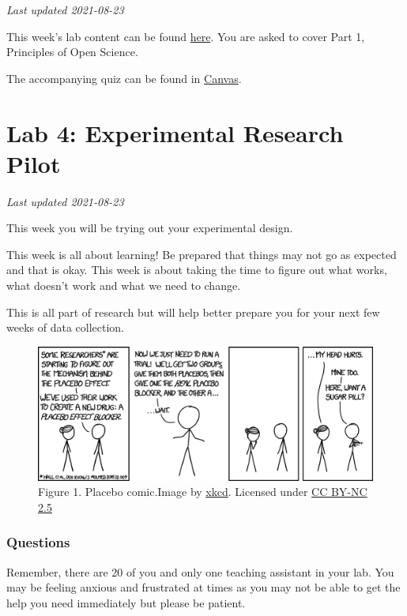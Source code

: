 \documentclass[
]{book}
\begin{document}
\emph{Last updated 2021-08-23}

This week's lab content can be found \href{https://ubco-biology.github.io/OS-Introduction/}{here}. You are asked to cover Part 1, Principles of Open Science.

The accompanying quiz can be found in \href{https://canvas.ubc.ca/courses/90147}{Canvas}.

\hypertarget{lab-4-experimental-research-pilot}{%
\chapter*{Lab 4: Experimental Research Pilot}\label{lab-4-experimental-research-pilot}}

\emph{Last updated 2021-08-23}

This week you will be trying out your experimental design.

This week is all about learning! Be prepared that things may not go as expected and that is okay. This week is about taking the time to figure out what works, what doesn't work and what we need to change.

This is all part of research but will help better prepare you for your next few weeks of data collection.

\begin{figure}
\centering
\includegraphics{figures_images/Lab4-Fig1.png}
\caption{Figure 1. Placebo comic.Image by \href{https://xkcd.com/1526/}{xkcd}. Licensed under \href{https://creativecommons.org/licenses/by-nc/2.5/}{CC BY-NC 2.5}}
\end{figure}

\hypertarget{questions}{%
\subsection*{Questions}\label{questions}}

Remember, there are 20 of you and only one teaching assistant in your lab. You may be feeling anxious and frustrated at times as you may not be able to get the help you need immediately but please be patient.
\end{document}
